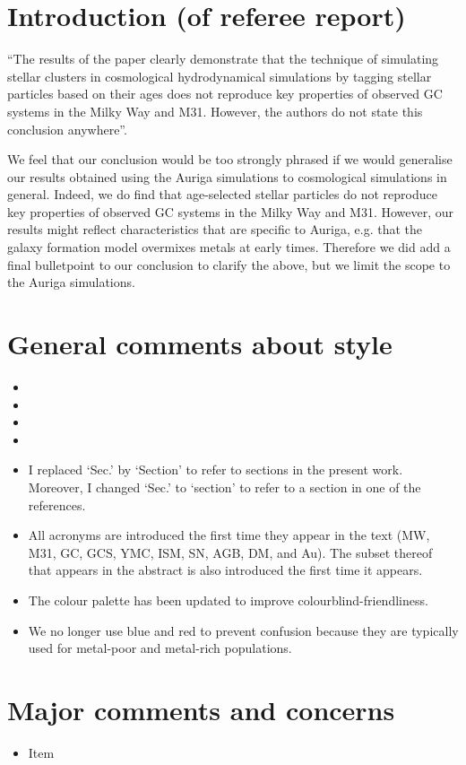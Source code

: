 \documentclass{article}
\begin{document}
\section*{Introduction (of referee report)}
``The results of the paper clearly demonstrate that the technique of simulating
stellar clusters in cosmological hydrodynamical simulations by tagging stellar
particles based on their ages does not reproduce key properties of observed GC 
systems in the Milky Way and M31. However, the authors do not state this conclusion
anywhere''.

We feel that our conclusion would be too strongly phrased if we would generalise 
our results obtained using the Auriga simulations to cosmological simulations 
in general. Indeed, we do find that age-selected stellar particles do not 
reproduce key properties of observed GC systems in the Milky Way and M31. However,
our results might reflect characteristics that are specific to Auriga, 
e.g. that the galaxy formation model overmixes metals at early times. 
Therefore we did add a final bulletpoint to our conclusion to clarify the above, 
but we limit the scope to the Auriga simulations. 

\section*{General comments about style}
\begin{itemize}
\item
\item
\item
\item
\item I replaced `Sec.' by `Section' to refer to sections in the present work.
Moreover, I changed `Sec.' to `section' to refer to a section in one of the references.
\item All acronyms are introduced the first time they appear in the text
(MW, M31, GC, GCS, YMC, ISM, SN, AGB, DM, and Au). The subset thereof that appears 
in the abstract is also introduced the first time it appears.
\item The colour palette has been updated to improve colourblind-friendliness.
\item We no longer use blue and red to prevent confusion because they are 
typically used for metal-poor and metal-rich populations.
\end{itemize}


\section*{Major comments and concerns}
\begin{itemize}
\item Item
\end{itemize}
\end{document}
